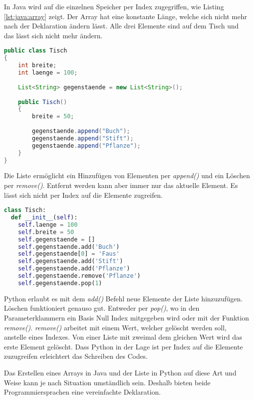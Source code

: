 In Java wird auf die einzelnen Speicher per Index zugegriffen, wie Listing \ref{lst:java:array} zeigt. Der Array hat eine konstante Länge, welche sich nicht mehr nach der Deklaration ändern lässt. Alle drei Elemente sind auf dem Tisch und das lässt sich nicht mehr ändern.
\newpage
\begin{lstlisting}[language=java,caption={Liste in Java},captionpos=b,label={lst:java:liste},frame=none]
public class Tisch
{
    int breite;
    int laenge = 100;
  
    List<String> gegenstaende = new List<String>();
  
    public Tisch()
    {
        breite = 50;
    
        gegenstaende.append("Buch");
        gegenstaende.append("Stift");
        gegenstaende.append("Pflanze");
    }
}
\end{lstlisting}

Die Liste ermöglicht ein Hinzufügen von Elementen per \textit{append()} und ein Löschen per \textit{remove()}. Entfernt werden kann aber immer nur das aktuelle Element. Es lässt sich nicht per Index auf die Elemente zugreifen.

\begin{lstlisting}[language=python,caption={Liste in Python},captionpos=b,label={lst:python:liste},frame=none]
class Tisch:
  def __init__(self):
    self.laenge = 100
    self.breite = 50
    self.gegenstaende = []
    self.gegenstaende.add('Buch')
    self.gegenstaende[0] = 'Faus'
    self.gegenstaende.add('Stift')
    self.gegenstaende.add('Pflanze')
    self.gegenstaende.remove('Pflanze')
    self.gegenstaende.pop(1)
\end{lstlisting}

Python erlaubt es mit dem \textit{add()} Befehl neue Elemente der Liste hinzuzufügen. Löschen funktioniert genauso gut. Entweder per \textit{pop()}, wo in den Parameterklammern ein Basis Null Index mitgegeben wird oder mit der Funktion \textit{remove()}. \textit{remove()} arbeitet mit einem Wert, welcher gelöscht werden soll, anstelle eines Indexes. Von einer Liste mit zweimal dem gleichen Wert wird das erste Element gelöscht. Dass Python in der Lage ist per Index auf die Elemente zuzugreifen erleichtert das Schreiben des Codes.\par
Das Erstellen eines Arrays in Java und der Liste in Python auf diese Art und Weise kann je nach Situation umständlich sein. Deshalb bieten beide Programmiersprachen eine vereinfachte Deklaration.

